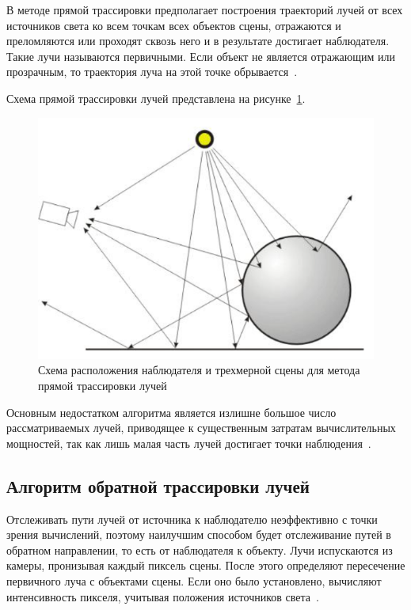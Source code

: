 \documentclass[a4paper, 14pt]{extreport}
\begin{document}
В методе прямой трассировки предполагает построения траекторий лучей от всех источников света ко всем точкам всех 
объектов сцены, отражаются и преломляются или проходят сквозь него и в результате достигает наблюдателя. Такие лучи 
называются первичными. Если объект не является отражающим или прозрачным, то траектория луча на этой точке 
обрывается~\cite{ulianov}.

Схема прямой трассировки лучей представлена на рисунке~\ref{analytic:forward-tracing}.

\begin{figure}[h]
	\centering
	\includegraphics[scale=0.7]{tools/forward-tracing.png}
	\caption{Схема расположения наблюдателя и трехмерной сцены для метода прямой трассировки лучей}
	\label{analytic:forward-tracing}
\end{figure}

Основным недостатком алгоритма является излишне большое число рассматриваемых лучей, приводящее к существенным 
затратам вычислительных мощностей, так как лишь малая часть лучей достигает точки наблюдения~\cite{livshic}.

\subsection{Алгоритм обратной трассировки лучей}

Отслеживать пути лучей от источника к наблюдателю неэффективно с точки зрения вычислений, поэтому наилучшим способом 
будет отслеживание путей в обратном направлении, то есть от наблюдателя к объекту. Лучи испускаются из камеры, 
пронизывая каждый пиксель сцены. После этого определяют пересечение первичного луча с объектами сцены. 
Если оно было установлено, вычисляют интенсивность пикселя, учитывая положения источников света~\cite{eromin}.
\end{document}
